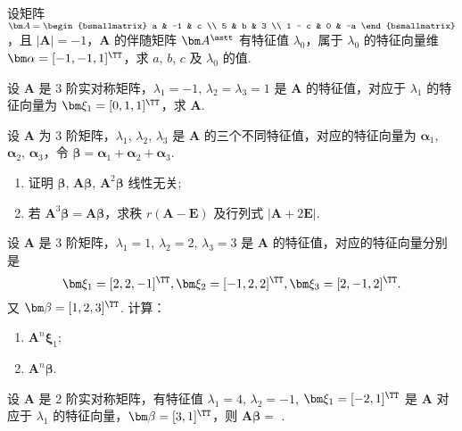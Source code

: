 	\begin{titwo}
		设矩阵 $\bm A = \begin{bsmallmatrix}
			a & -1 & c \\
			5 & b & 3 \\
			1 - c & 0 & -a
		\end{bsmallmatrix}$，且 $|\bm A| = -1$，$\bm A$ 的伴随矩阵 $\bm A^{\astt}$ 有特征值 $\lambda_{0}$，属于 $\lambda_{0}$ 的特征向量维 $\bm \alpha = [-1,-1,1]^{\TT}$，求 $a$, $b$, $c$ 及 $\lambda_{0}$ 的值.
	\end{titwo}

	\begin{titwo}
		设 $\bm A$ 是 $3$ 阶实对称矩阵，$\lambda_{1} = -1$, $\lambda_{2} = \lambda_{3} = 1$ 是 $\bm A$ 的特征值，对应于 $\lambda_{1}$ 的特征向量为 $\bm \xi_{1} = [0,1,1]^{\TT}$，求 $\bm A$.
	\end{titwo}

	\begin{titwo}
		设 $\bm A$ 为 $3$ 阶矩阵，$\lambda_{1}$, $\lambda_{2}$, $\lambda_{3}$ 是 $\bm A$ 的三个不同特征值，对应的特征向量为 $\bm \alpha_{1}$, $\bm \alpha_{2}$, $\bm \alpha_{3}$，令 $\bm \beta = \bm \alpha_{1} + \bm \alpha_{2} + \bm \alpha_{3}$.
		\begin{enumerate}
			\item 证明 $\bm \beta$, $\bm A \bm \beta$, $\bm A^{2} \bm \beta$ 线性无关;
			\item 若 $\bm A^{3} \bm \beta = \bm A \bm \beta$，求秩 $r(\bm A - \bm E)$ 及行列式 $|\bm A + 2 \bm E|$.
		\end{enumerate}
	\end{titwo}

	\begin{titwo}
		设 $\bm A$ 是 $3$ 阶矩阵，$\lambda_{1} = 1$, $\lambda_{2} = 2$, $\lambda_{3} = 3$ 是 $\bm A$ 的特征值，对应的特征向量分别是
		\[
			\bm \xi_{1} = [2,2,-1]^{\TT}, \bm \xi_{2} = [-1,2,2]^{\TT}, \bm \xi_{3} = [2,-1,2]^{\TT}.
		\]
		又 $\bm \beta = [1,2,3]^{\TT}$. 计算：
		\begin{enumerate}
			\item $\bm A^{n} \bm \xi_{1}$;
			\item $\bm A^{n} \bm \beta$.
		\end{enumerate}
	\end{titwo}

	\begin{titwo}
		设 $\bm A$ 是 $2$ 阶实对称矩阵，有特征值 $\lambda_{1} = 4$, $\lambda_{2} = -1$, $\bm \xi_{1} = [-2,1]^{\TT}$ 是 $\bm A$ 对应于 $\lambda_{1}$ 的特征向量，$\bm \beta = [3,1]^{\TT}$，则 $\bm A \bm \beta = $ \htwo.
	\end{titwo}

